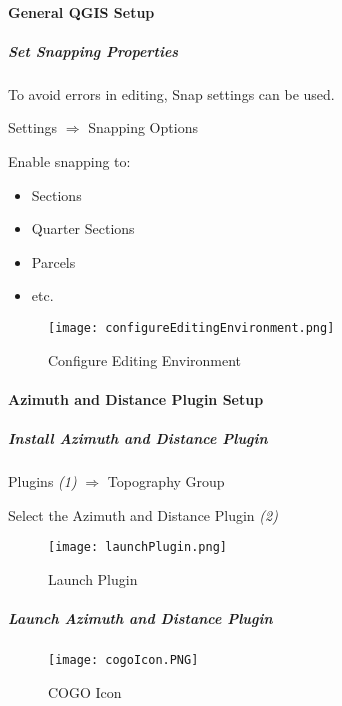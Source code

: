 \paragraph{General QGIS Setup}
\subparagraph{Set Snapping Properties}
To avoid errors in editing, Snap settings can be used.

\vspace{.2in}

\noindent Settings $\Rightarrow$ Snapping Options
\vspace{.2in}

\noindent Enable snapping to:

\begin{itemize}
\item Sections
\item Quarter Sections
\item Parcels 
\item etc.
\end{itemize}
\begin{figure}[H]
\centering
\texttt{[image: configureEditingEnvironment.png]}
\vspace{-.1in}

\caption{Configure Editing Environment}
\end{figure}

\clearpage  
\paragraph{Azimuth and Distance Plugin Setup}
\vspace{.2in}

\subparagraph{Install Azimuth and Distance Plugin}

\noindent Plugins \emph{(1)} $\Rightarrow$ Topography Group
\vspace{.2in}

\noindent Select the Azimuth and Distance Plugin \emph{(2)}
\begin{figure}[H] %
\centering
    \texttt{[image: launchPlugin.png]}
\vspace{-.1in}

\caption{Launch Plugin}
\end{figure}
\vspace{.3in}

\subparagraph{Launch Azimuth and Distance Plugin}
\begin{figure}[H]
\centering
     \texttt{[image: cogoIcon.PNG]}

\caption{COGO Icon}
\end{figure}

